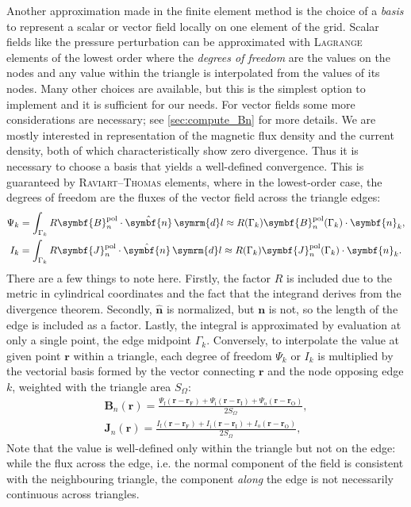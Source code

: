 \documentclass[a4paper, twoside, 10pt, english]{article}
\numberwithin{equation}{section}
\let\vec\symbf
\newcommand*\diff{\ensuremath{\symrm{d}}}  %
\newcommand*\pol{\ensuremath{\textrm{pol}}}  %
\newcommand*\fs{\ensuremath{\textrm{f}}}  %
\newcommand*\inw{\ensuremath{\textrm{i}}}  %
\newcommand*\out{\ensuremath{\textrm{o}}}  %
\newcommand*\vfs{\ensuremath{\textrm{F}}}  %
\newcommand*\vinw{\ensuremath{\textrm{I}}}  %
\newcommand*\vout{\ensuremath{\textrm{O}}}  %
\begin{document}
Another approximation made in the finite element method is the choice of a \emph{basis} to represent a scalar or vector field locally on one element of the grid. Scalar fields like the pressure perturbation can be approximated with \textsc{Lagrange} elements of the lowest order where the \emph{degrees of freedom} are the values on the nodes and any value within the triangle is interpolated from the values of its nodes. Many other choices are available, but this is the simplest option to implement and it is sufficient for our needs. For vector fields some more considerations are necessary; see \cref{sec:compute_Bn} for more details. We are mostly interested in representation of the magnetic flux density and the current density, both of which characteristically show zero divergence. Thus it is necessary to choose a basis that yields a well-defined convergence. This is guaranteed by \textsc{Raviart}--\textsc{Thomas} elements, where in the lowest-order case, the degrees of freedom are the fluxes of the vector field across the triangle edges:
\begin{gather}
  \Psi_{k} = \int_{\Gamma_{k}} R \vec{B}_{n}^{\pol} \cdot \hat{\vec{n}} \, \diff l \approx R (\Gamma_{k}) \vec{B}_{n}^{\pol} (\Gamma_{k}) \cdot \vec{n}_{k}, \label{eq:Psi_k} \\
  I_{k} = \int_{\Gamma_{k}} R \vec{J}_{n}^{\pol} \cdot \hat{\vec{n}} \, \diff l \approx R (\Gamma_{k}) \vec{J}_{n}^{\pol} (\Gamma_{k}) \cdot \vec{n}_{k}. \label{eq:I_k}
\end{gather}
There are a few things to note here. Firstly, the factor $R$ is included due to the metric in cylindrical coordinates and the fact that the integrand derives from the divergence theorem. Secondly, $\hat{\vec{n}}$ is normalized, but $\vec{n}$ is not, so the length of the edge is included as a factor. Lastly, the integral is approximated by evaluation at only a single point, the edge midpoint $\Gamma_{k}$. Conversely, to interpolate the value at given point $\vec{r}$ within a triangle, each degree of freedom $\Psi_{k}$ or $I_{k}$ is multiplied by the vectorial basis formed by the vector connecting $\vec{r}$ and the node opposing edge $k$, weighted with the triangle area $S_{\Omega}$:
\begin{gather}
  \vec{B}_{n} (\vec{r}) = \frac{\Psi_{\fs} (\vec{r} - \vec{r}_{\vfs}) + \Psi_{\inw} (\vec{r} - \vec{r}_{\vinw}) + \Psi_{\out} (\vec{r} - \vec{r}_{\vout})}{2 S_{\Omega}}, \\
  \vec{J}_{n} (\vec{r}) = \frac{I_{\fs} (\vec{r} - \vec{r}_{\vfs}) + I_{\inw} (\vec{r} - \vec{r}_{\vinw}) + I_{\out} (\vec{r} - \vec{r}_{\vout})}{2 S_{\Omega}},
\end{gather}
Note that the value is well-defined only within the triangle but not on the edge: while the flux across the edge, i.e. the normal component of the field is consistent with the neighbouring triangle, the component \emph{along} the edge is not necessarily continuous across triangles.
\end{document}
